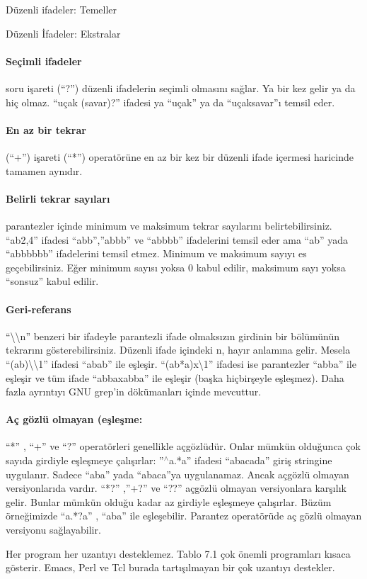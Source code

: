 \begin{section}{Düzenli ifadeler: Temeller}
\begin{subsection}{Düzenli İfadeler: Ekstralar}
\paragraph{Seçimli ifadeler} {soru işareti (“?”) düzenli ifadelerin seçimli olmasını sağlar. Ya bir kez gelir ya da hiç olmaz.	“uçak (savar)?” ifadesi ya “uçak” ya da “uçaksavar”ı temsil eder.}
\paragraph{En az bir tekrar}{ (“+”) işareti (“*”) operatörüne en az bir kez bir düzenli ifade içermesi haricinde tamamen aynıdır. }
\paragraph{Belirli tekrar sayıları}{ parantezler içinde minimum ve maksimum tekrar sayılarını belirtebilirsiniz. “ab{2,4}” ifadesi “abb”,”abbb” ve “abbbb” ifadelerini temsil eder ama “ab” yada “abbbbbb” ifadelerini temsil etmez. Minimum ve maksimum sayıyı es geçebilirsiniz. Eğer minimum sayısı yoksa 0 kabul edilir, maksimum sayı yoksa  “sonsuz” kabul edilir.}
\paragraph{Geri-referans}{ “\textbackslash \textbackslash n” benzeri bir ifadeyle parantezli ifade olmaksızın girdinin bir bölümünün tekrarını gösterebilirsiniz. Düzenli ifade içindeki n, hayır anlamına gelir. Mesela “(ab)\textbackslash \textbackslash 1” ifadesi “abab” ile eşleşir. “(ab*a)x\textbackslash 1” ifadesi ise parantezler “abba” ile eşleşir ve tüm ifade “abbaxabba” ile eşleşir (başka hiçbirşeyle eşleşmez). Daha fazla ayrıntıyı GNU grep’in dökümanları içinde mevcuttur.}
\paragraph{Aç gözlü olmayan (eşleşme:}{
 “*” , “+” ve “?” operatörleri genellikle açgözlüdür. Onlar mümkün olduğunca çok sayıda girdiyle eşleşmeye çalışırlar: ”$ ^\wedge $a.*a” ifadesi “abacada” giriş stringine uygulanır. Sadece “aba” yada “abaca”ya uygulanamaz. Ancak açgözlü olmayan versiyonlarıda vardır. “*?” ,”+?” ve “??” açgözlü olmayan versiyonlara karşılık gelir. Bunlar mümkün olduğu kadar az girdiyle eşleşmeye çalışırlar. Büzüm örneğimizde “a.*?a” , “aba” ile eşleşebilir. Parantez operatörüde aç gözlü olmayan versiyonu sağlayabilir.}
 
Her program her uzantıyı desteklemez. Tablo 7.1 çok önemli programları kısaca gösterir. Emacs, Perl ve Tcl burada tartışılmayan bir çok uzantıyı destekler.
\end{subsection}
\end{section}
